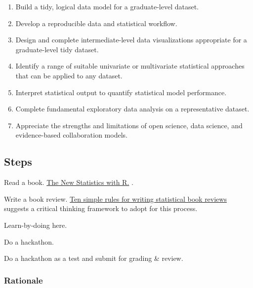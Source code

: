 \documentclass[
]{book}
\providecommand{\tightlist}{%
  \setlength{\itemsep}{0pt}\setlength{\parskip}{0pt}}
\begin{document}
\begin{enumerate}
\def\labelenumi{\arabic{enumi}.}
\tightlist
\item
  Build a tidy, logical data model for a graduate-level dataset.\\
\item
  Develop a reproducible data and statistical workflow.\\
\item
  Design and complete intermediate-level data visualizations appropriate for a graduate-level tidy dataset.\\
\item
  Identify a range of suitable univariate or multivariate statistical approaches that can be applied to any dataset.\\
\item
  Interpret statistical output to quantify statistical model performance.\\
\item
  Complete fundamental exploratory data analysis on a representative dataset.\\
\item
  Appreciate the strengths and limitations of open science, data science, and evidence-based collaboration models.
\end{enumerate}

\hypertarget{steps}{%
\subsection*{Steps}\label{steps}}

Read a book. \href{https://global.oup.com/academic/product/the-new-statistics-with-r-9780198798187?cc=us\&lang=en\&}{The New Statistics with R.} \citep{RN7358}.

Write a book review. \href{https://journals.plos.org/ploscompbiol/article?id=10.1371/journal.pcbi.1006562}{Ten simple rules for writing statistical book reviews} \citep{RN6148} suggests a critical thinking framework to adopt for this process.

Learn-by-doing here.

Do a hackathon.

Do a hackathon as a test and submit for grading \& review.

\hypertarget{rationale}{%
\subsubsection*{Rationale}\label{rationale}}
\end{document}
